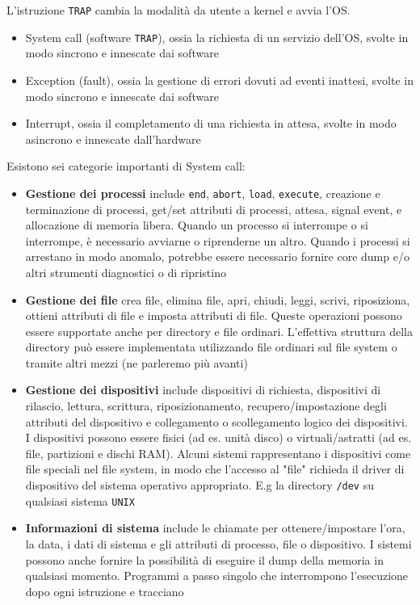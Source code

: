 \documentclass{article}
\begin{document}
L'istruzione \texttt{TRAP} cambia la modalità da utente a kernel e avvia l'OS. 
\begin{itemize}
    \item System call (software \texttt{TRAP}), ossia la richiesta di un servizio dell'OS, svolte in modo sincrono e innescate dai software
    \item Exception (fault), ossia la gestione di errori dovuti ad eventi inattesi, svolte in modo sincrono e innescate dai software
    \item Interrupt, ossia il completamento di una richiesta in attesa, svolte in modo asincrono e innescate dall'hardware
\end{itemize}

Esistono sei categorie importanti di System call:
\begin{itemize}
    \item \textbf{Gestione dei processi} include \texttt{end}, \texttt{abort}, \texttt{load}, \texttt{execute}, creazione e terminazione di processi, get/set attributi di processi, attesa, signal event, e allocazione di memoria libera. Quando un processo si interrompe o si interrompe, è necessario avviarne o riprenderne un altro. Quando i processi si arrestano in modo anomalo, potrebbe essere necessario fornire core dump e/o altri strumenti diagnostici o di ripristino
    \item \textbf{Gestione dei file} crea file, elimina file, apri, chiudi, leggi, scrivi, riposiziona, ottieni attributi di file e imposta attributi di file. Queste operazioni possono essere supportate anche per directory e file ordinari. L'effettiva struttura della directory può essere implementata utilizzando file ordinari sul file system o tramite altri mezzi (ne parleremo più avanti)
    \item \textbf{Gestione dei dispositivi} include dispositivi di richiesta, dispositivi di rilascio, lettura, scrittura, riposizionamento, recupero/impostazione degli attributi del dispositivo e collegamento o scollegamento logico dei dispositivi. I dispositivi possono essere fisici (ad es. unità disco) o virtuali/astratti (ad es. file, partizioni e dischi RAM). Alcuni sistemi rappresentano i dispositivi come file speciali nel file system, in modo che l'accesso al "file" richieda il driver di dispositivo del sistema operativo appropriato. E.g la directory \texttt{/dev} su qualsiasi sistema \texttt{UNIX}
    \item \textbf{Informazioni di sistema} include le chiamate per ottenere/impostare l'ora, la data, i dati di sistema e gli attributi di processo, file o dispositivo. I sistemi possono anche fornire la possibilità di eseguire il dump della memoria in qualsiasi momento. Programmi a passo singolo che interrompono l'esecuzione dopo ogni istruzione e tracciano

\end{itemize}
\end{document}

